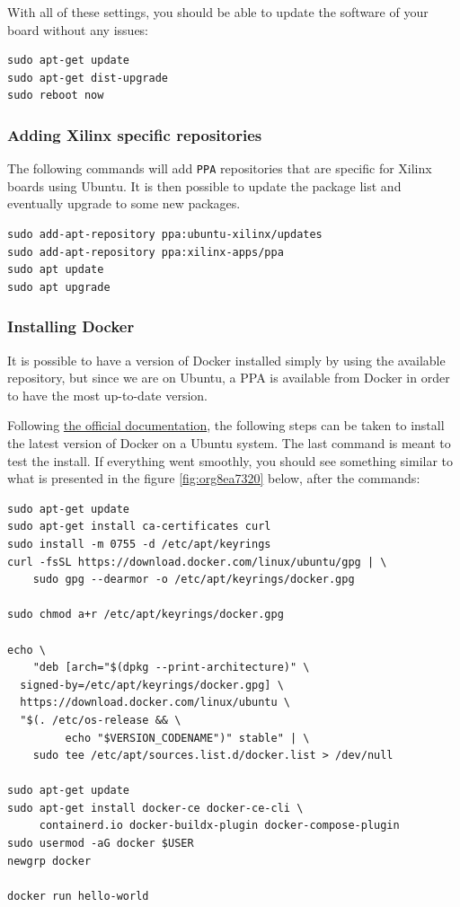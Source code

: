 \documentclass[10pt]{article}
\begin{document}
With all of these settings, you should be able to update the software of your
board without any issues:
\begin{verbatim}
sudo apt-get update
sudo apt-get dist-upgrade
sudo reboot now
\end{verbatim}

\subsubsection{Adding Xilinx specific repositories}
\label{sec:org374ef57}
The following commands will add \texttt{PPA} repositories that are specific for Xilinx boards using Ubuntu.
It is then possible to update the package list and eventually upgrade to some new packages.
\begin{verbatim}
sudo add-apt-repository ppa:ubuntu-xilinx/updates
sudo add-apt-repository ppa:xilinx-apps/ppa
sudo apt update
sudo apt upgrade
\end{verbatim}

\subsubsection{Installing Docker}
\label{sec:org5c00e38}
It is possible to have a version of Docker installed simply by using the available repository,
but since we are on Ubuntu, a PPA is available from Docker in order to have the most up-to-date version.

Following \href{https://docs.docker.com/engine/install/ubuntu/\#install-using-the-repository}{the official documentation}, the following steps can be taken to install the latest version of
Docker on a Ubuntu system. The last command is meant to test the install.
If everything went smoothly, you should see something similar to what is presented
in the figure \ref{fig:org8ea7320} below, after the commands:

\begin{verbatim}
sudo apt-get update
sudo apt-get install ca-certificates curl
sudo install -m 0755 -d /etc/apt/keyrings
curl -fsSL https://download.docker.com/linux/ubuntu/gpg | \
    sudo gpg --dearmor -o /etc/apt/keyrings/docker.gpg

sudo chmod a+r /etc/apt/keyrings/docker.gpg

echo \
    "deb [arch="$(dpkg --print-architecture)" \
  signed-by=/etc/apt/keyrings/docker.gpg] \
  https://download.docker.com/linux/ubuntu \
  "$(. /etc/os-release && \
         echo "$VERSION_CODENAME")" stable" | \
    sudo tee /etc/apt/sources.list.d/docker.list > /dev/null

sudo apt-get update
sudo apt-get install docker-ce docker-ce-cli \
     containerd.io docker-buildx-plugin docker-compose-plugin
sudo usermod -aG docker $USER
newgrp docker

docker run hello-world
\end{verbatim}
\end{document}
